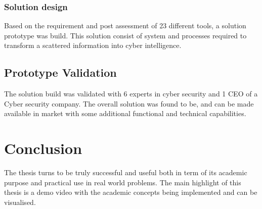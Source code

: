 \subsubsection{Solution design}
Based on the requirement and post assessment of 23 different tools, a solution prototype was build. This solution consist of system and processes required to transform a scattered information into cyber intelligence.

\subsection{Prototype Validation}
The solution build was validated with 6 experts in cyber security and 1 CEO of a Cyber security company. The overall solution was found to be, and  can be made available in market with some additional functional and technical capabilities.

\section{Conclusion }
The thesis turns to be truly successful and useful both in term of its academic purpose and practical use in real world problems. The main highlight of this thesis is a demo video with the academic concepts being implemented and can be visualised.








